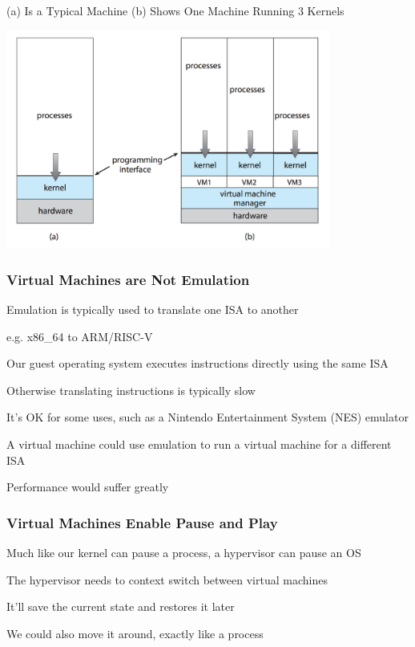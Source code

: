  \begin{frame}{(a) Is a Typical Machine (b) Shows One Machine Running 3 Kernels}
    \begin{center}
      \includegraphics[width=0.8\textwidth]{non-virtual-machine.png}
    \end{center}
  \end{frame}

  \begin{frame}
    \frametitle{Virtual Machines are Not Emulation}

    Emulation is typically used to translate one ISA to another

    \hspace{2em} e.g. x86\_64 to ARM/RISC-V

    \vspace{2em}

    Our guest operating system executes instructions directly using the same ISA

    \hspace{2em} Otherwise translating instructions is typically slow

    \vspace{2em}

    It's OK for some uses, such as a Nintendo Entertainment System (NES)
    emulator

    \vspace{2em}

    A virtual machine could use emulation to run a virtual machine for a
    different ISA

    \hspace{2em} Performance would suffer greatly
  \end{frame}

  \begin{frame}
    \frametitle{Virtual Machines Enable Pause and Play}

    Much like our kernel can pause a process, a hypervisor can pause an OS

    \vspace{2em}

    The hypervisor needs to context switch between  virtual machines

    \hspace{2em} It'll save the current state and restores it later

    \vspace{2em}

    We could also move it around, exactly like a process
  \end{frame}

